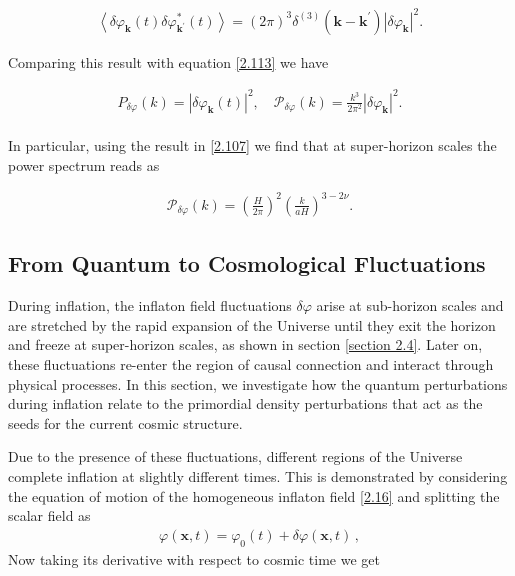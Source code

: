 \begin{align}
    \left\langle\delta \varphi_{\mathbf{k}}(t) \delta \varphi_{\mathbf{k}^{\prime}}^{*}(t)\right\rangle=(2 \pi)^{3} \delta^{(3)}\left(\mathbf{k}-\mathbf{k}^{\prime}\right)\left|\delta \varphi_{\mathbf{k}}\right|^{2} .\label{2.124}
\end{align}

Comparing this result with equation \ref{2.113} we have 

\begin{align}
    P_{\delta \varphi}(k)=\left|\delta \varphi_{\mathbf{k}}(t)\right|^{2}, \quad \mathcal{P}_{\delta \varphi}(k)=\frac{k^{3}}{2 \pi^{2}}\left|\delta \varphi_{\mathbf{k}}\right|^{2} .\label{2.125}
\end{align}\\

In particular, using the result in \ref{2.107} we find that at super-horizon scales the power spectrum reads as

\begin{align}
    \mathcal{P}_{\delta \varphi}(k)=\left(\frac{H}{2 \pi}\right)^{2}\left(\frac{k}{a H}\right)^{3-2 \nu} .\label{2.126}
\end{align}

\subsection{From Quantum to Cosmological Fluctuations}
During inflation, the inflaton field fluctuations $\delta \varphi$ arise at sub-horizon scales and are stretched by the rapid expansion of the Universe until they exit the horizon and freeze at super-horizon scales, as shown in section \ref{section 2.4}. Later on, these fluctuations re-enter the region of causal connection and interact through physical processes. In this section, we investigate how the quantum perturbations during inflation relate to the primordial density perturbations that act as the seeds for the current cosmic structure.

Due to the presence of these fluctuations, different regions of the Universe complete inflation at slightly different times. This is demonstrated by considering the equation of motion of the homogeneous inflaton field \ref{2.16} and splitting the scalar field as 
\begin{align}
    \varphi (\mathbf{x}, t) = \varphi_0 (t) + \delta \varphi (\mathbf{x}, t)
    \,, \label{2.127}
\end{align}
Now taking its derivative with respect to cosmic time we get

